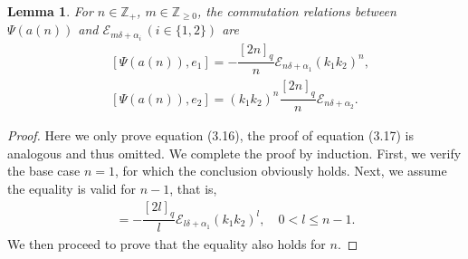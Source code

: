\documentclass[12pt]{amsart}
\newtheorem{lemma}[theorem]{Lemma}
\numberwithin{equation}{section}
\numberwithin{equation}{section}
\begin{document}
\begin{lemma} 
For \(n\in\mathbb{Z}_{+}\), \(m\in\mathbb{Z}_{\ge 0}\), the commutation relations between \(\Psi(a(n))\) and \(\mathcal{E}_{m\delta+\alpha_i}\,(i\in\{1,2\})\) are  
\begin{align}
&[\Psi(a(n)), e_{1}]  = -\dfrac{[2n]_q}{n} \mathcal{E}_{n\delta+\alpha_1}(k_1k_2)^n,\\
&[\Psi(a(n)), e_2]  =(k_1k_2)^n\dfrac{[2n]_q}{n} \mathcal{E}_{n\delta+\alpha_2}.
\end{align}   
\end{lemma}  
\begin{proof}
Here we only prove equation (3.16), the proof of equation (3.17) is analogous and thus omitted. We complete the proof by  induction. First, we verify the base case \(n=1\), for which the conclusion obviously holds. 
Next, we assume  the equality is valid for \(n-1\), that is,
\begin{align}
[\Psi(a(l)), e_{1}]  = -\dfrac{[2l]_q}{l} \mathcal{E}_{l\delta+\alpha_1}(k_1k_2)^l,\quad  0<l\le n-1.
\end{align}
We then proceed to prove that the equality also holds for \(n\).


\end{proof}
\end{document}
